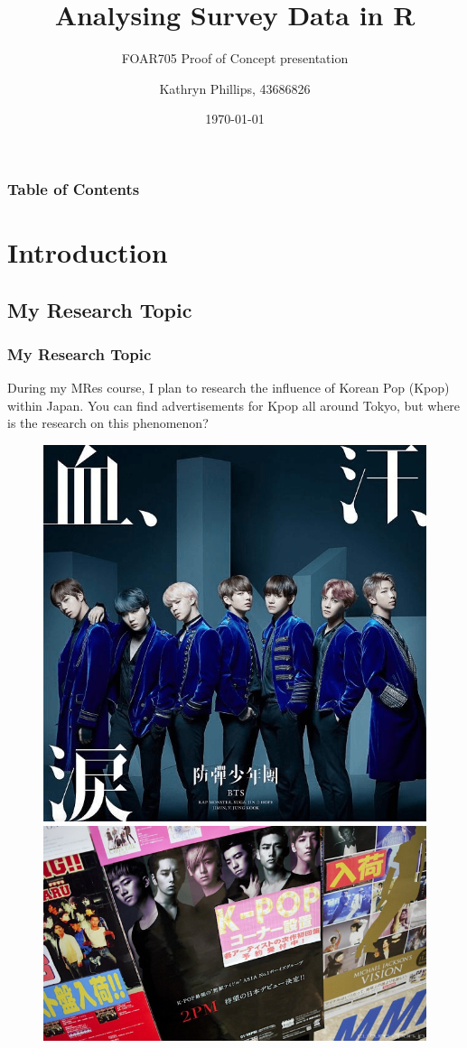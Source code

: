 \documentclass[aspectratio=1610]{beamer}
\title{Analysing Survey Data in R}
\subtitle{FOAR705 Proof of Concept presentation}
\author{Kathryn Phillips, 43686826}
\institute{Department of International Studies}
\date{\today}
\begin{document}
\begin{frame}
\frame{\titlepage}
\end{frame}
\begin{frame}
\frametitle{Table of Contents}
\tableofcontents
\end{frame}
\section{Introduction}
\subsection{My Research Topic}
\begin{frame}
\frametitle{My Research Topic}
During my MRes course, I plan to research the influence of Korean Pop (Kpop) within Japan.
\newline
You can find advertisements for Kpop all around Tokyo, but where is the research on this phenomenon?
\newline
\begin{figure}[h]
\includegraphics[scale=0.2]{bts}
\includegraphics[scale=0.6]{kpopexample}
\end{figure}
\end{frame}
\end{document}
